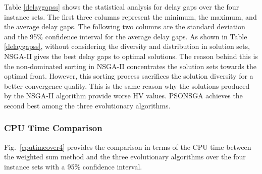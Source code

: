 \documentclass[10pt,journal,compsoc]{IEEEtran}
\newcommand{\Fig}[1]{Fig.~\ref{#1}}
\begin{document}
\fi
Table \ref{delaygapss} shows the statistical analysis for delay gaps over the four instance sets. The first three columns represent the minimum, the maximum, and the average delay gaps. The following two columns are the standard deviation and the 95\% confidence interval for the average delay gaps. As shown in Table \ref{delaygapss}, without considering the diversity and distribution in solution sets, NSGA-II gives the best delay gaps to optimal solutions. The reason behind this is the non-dominated sorting in NSGA-II concentrates the solution sets towards the optimal front. However, this sorting process sacrifices the solution diversity for a better convergence quality. This is the same reason why the solutions produced by the NSGA-II algorithm provide worse HV values. PSONSGA achieves the second best among the three evolutionary algorithms.

\begin{table}[ht]
\centering
\caption{Delay gap comparison (over four instance sets)}\label{delaygapss}
\end{table}

\subsubsection{CPU Time Comparison}
\Fig{cputimeover4} provides the comparison in terms of the CPU time between the weighted sum method and the three evolutionary algorithms over the four instance sets with a 95\% confidence interval. 

\end{document}
